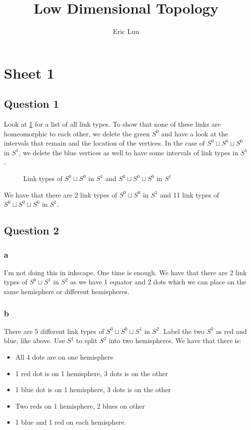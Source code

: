\documentclass{article}
\title{Low Dimensional Topology}
\author{Eric Luu}
\theoremstyle{definition}
\numberwithin{theorem}{section}
\numberwithin{equation}{section}
\begin{document}
\section{Sheet 1}

\subsection{Question 1}
Look at \cref{fig:W1Q1} for a list of all link types. To show that none of these links are homeomorphic to each other, we delete the green $S^0$ and have a look at the intervals that remain and the location of the vertices. In the case of $S^0 \sqcup S^0 \sqcup S^0 $ in $S^1$, we delete the blue vertices as well to have some intervals of link types in $S^1$. 
\begin{figure}\label{fig:W1Q1}
    
    \caption{Link types of $S^0 \sqcup S^0$ in $S^1$ and $S^0 \sqcup S^0 \sqcup S^0 $ in $S^1$}
\end{figure}

We have that there are 2 link types of $S^0 \sqcup S^0$ in $S^1$ and 11 link types of $S^0 \sqcup S^0 \sqcup S^0$ in $S^1$.  

\subsection{Question 2}
\subsubsection{a}
I'm not doing this in inkscape. One time is enough. We have that there are 2 link types of $S^0 \sqcup S^1$ in $S^2$ as we have 1 equator and 2 dots which we can place on the same hemisphere or different hemispheres. 

\subsubsection{b}
There are 5 different link types of $S^0 \sqcup S^0 \sqcup S^1$ in $S^2$. Label the two $S^0$ as red and blue, like above. Use $S^1$ to split $S^2$ into two hemispheres. We have that there is:
\begin{itemize}
    \item All 4 dots are on one hemisphere
    \item 1 red dot is on 1 hemisphere, 3 dots is on the other
    \item 1 blue dot is on 1 hemisphere, 3 dots is on the other
    \item Two reds on 1 hemisphere, 2 blues on other
    \item 1 blue and 1 red on each hemisphere.
\end{itemize}
\end{document}
